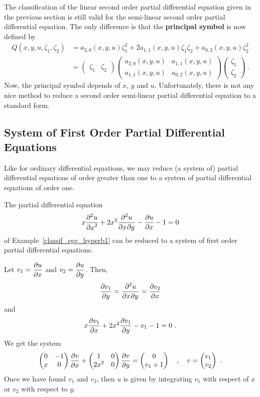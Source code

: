 The classification of the linear second order partial differential
equation given in the previous section is still valid for the
semi-linear second order partial differential equation.  The only
difference is that the {\bfseries principal symbol}
is now defined by
\begin{align*}
Q(x,y,u,\zeta_1,\zeta_2) &= a_{2,0}(x,y,u) \zeta_1^2 +
2a_{1,1}(x,y,u)\zeta_1\zeta_2 + a_{0,2}(x,y,u) \zeta_2^2 \\
&=
\begin{pmatrix}
\zeta_1 & \zeta_2
\end{pmatrix}
\begin{pmatrix}
a_{2,0}(x,y,u) & a_{1,1}(x,y,u) \\
a_{1,1}(x,y,u) & a_{0,2}(x,y,u)  
\end{pmatrix}
\begin{pmatrix}
\zeta_1 \\ \zeta_2
\end{pmatrix} \ .
\end{align*}
Now, the principal symbol depends of $x$, $y$ and $u$.  Unfortunately,
there is not any nice method to reduce a second order semi-linear
partial differential equation to a standard form.

\subsection{System of First Order Partial Differential Equations}

Like for ordinary differential equations, we may reduce (a system of)
partial differential equations of order greater
than one to a system of partial differential equations of order one.

\begin{egg}
The partial differential equation
\[
x \pdydxn{u}{x}{2} + 2 x^2 \pdydxnm{u}{x}{y}{2}{}{} - \pdydx{u}{x} - 1
= 0
\]
of Example~\ref{classif_egg_hyperb1} can be reduced to a system of
first order partial differential equations.

Let $\displaystyle v_1 = \pdydx{u}{x}$ and
$\displaystyle v_2 = \pdydx{u}{y}$.  Then,
\[
\pdydx{v_1}{y} = \pdydxnm{u}{x}{y}{2}{}{} = \pdydx{v_2}{x}
\]
and
\[
x \pdydx{v_1}{x} + 2 x^2 \pdydx{v_1}{y} - v_1 - 1 = 0 \  .
\]
We get the system
\[
\begin{pmatrix}
0 & -1 \\
x & 0
\end{pmatrix}
\pdydx{v}{x}
+
\begin{pmatrix}
1 & 0 \\
2x^2 & 0
\end{pmatrix}
\pdydx{v}{y}
=
\begin{pmatrix}
0 \\ v_1+1
\end{pmatrix} \quad , \quad
v =
\begin{pmatrix}
v_1 \\ v_2
\end{pmatrix} \ .
\]
Once we have found $v_1$ and $v_2$, then $u$ is
given by integrating $v_1$ with respect of $x$ or $v_2$ with
respect to $y$.
\end{egg}

